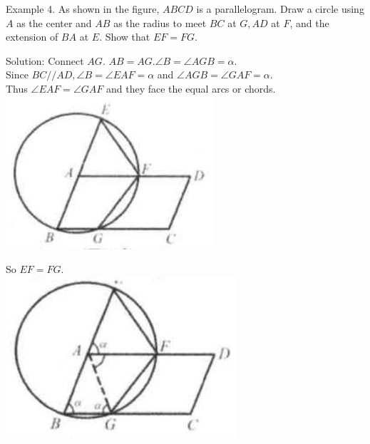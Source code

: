 \documentclass[10pt]{article}
\begin{document}
Example 4. As shown in the figure, \(A B C D\) is a parallelogram. Draw a circle using \(A\) as the center and \(A B\) as the radius to meet \(B C\) at \(G, A D\) at \(F\), and the extension of \(B A\) at \(E\). Show that \(E F=F G\).

Solution:
Connect \(A G\). \(A B=A G . \angle B=\angle A G B=\alpha\).\\
Since \(B C / / A D, \angle B=\angle E A F=\alpha\) and \(\angle A G B=\angle G A F=\alpha\).\\
Thus \(\angle E A F=\angle G A F\) and they face the equal arcs or chords.\\
\includegraphics[max width=\textwidth, center]{2025_04_17_97bc1f7e44d93c271a88g-148(3)}

So \(E F=F G\).\\
\includegraphics[max width=\textwidth, center]{2025_04_17_97bc1f7e44d93c271a88g-148(2)}
\end{document}
